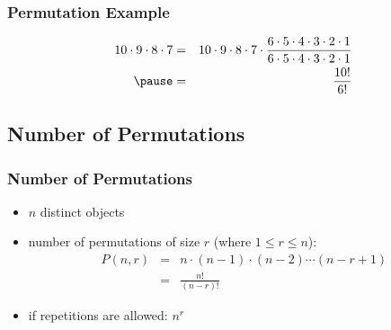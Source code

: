 \documentclass[dvipsnames]{beamer}
\begin{document}
\begin{frame}
  \frametitle{Permutation Example}

  \begin{eqnarray*}
    10 \cdot 9 \cdot 8 \cdot 7 & = &
      10 \cdot 9 \cdot 8 \cdot 7 \cdot
      \frac{6 \cdot 5 \cdot 4 \cdot 3 \cdot 2 \cdot 1}
      {6 \cdot 5 \cdot 4 \cdot 3 \cdot 2 \cdot 1}\\\pause
    & = & \frac{10!}{6!}
  \end{eqnarray*}
\end{frame}

\subsection{Number of Permutations}

\begin{frame}
  \frametitle{Number of Permutations}

  \begin{itemize}
    \item $n$ distinct objects
    \item number of permutations of size $r$ (where $1 \leq r \leq n$):\\
    \begin{eqnarray*}
      P(n,r) & = & n \cdot (n-1) \cdot (n-2) \cdots (n-r+1)\\
             & = & \frac{n!}{(n-r)!}
    \end{eqnarray*}

    \pause
    \medskip
    \item if repetitions are allowed: $n^r$
  \end{itemize}
\end{frame}
\end{document}
